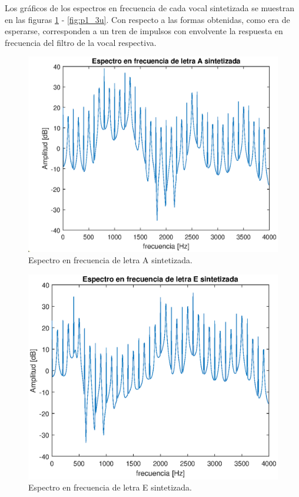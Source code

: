Los gráficos de los espectros en frecuencia de cada vocal sintetizada se muestran en las figuras \ref{fig:p1_3a} - \ref{fig:p1_3u}. Con respecto a las formas obtenidas, como era de esperarse, corresponden a un tren de impulsos con envolvente la respuesta en frecuencia del filtro de la vocal respectiva.

\begin{figure}[H]
    \centering
    \includegraphics[width = .8\linewidth]{figures/p1_3a.eps}
    \caption{Espectro en frecuencia de letra A sintetizada.}
    \label{fig:p1_3a}
\end{figure}

\begin{figure}[H]
    \centering
    \includegraphics[width = .8\linewidth]{figures/p1_3e.eps}
    \caption{Espectro en frecuencia de letra E sintetizada.}
    \label{fig:p1_3e}
\end{figure}

